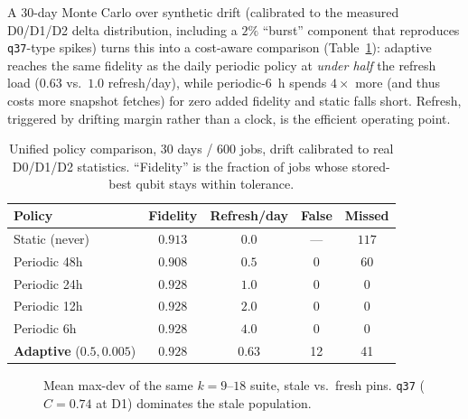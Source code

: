 \documentclass[journal,10pt,twocolumn]{IEEEtran}
\newcommand{\q}[1]{\texttt{q#1}}
\begin{document}
A 30-day Monte Carlo over synthetic drift (calibrated to the measured D0/D1/D2 delta distribution, including a
$2\%$ ``burst'' component that reproduces \q{37}-type spikes) turns this into a cost-aware comparison
(Table~\ref{tab:policy}): adaptive reaches the same fidelity as the daily periodic policy at \emph{under half} the
refresh load ($0.63$ vs.\ $1.0$ refresh/day), while periodic-$6$~h spends $4\times$ more (and thus costs more
snapshot fetches) for zero added fidelity and static falls short. Refresh, triggered by drifting margin rather than
a clock, is the efficient operating point.

\begin{table}[t]
\caption{Unified policy comparison, 30 days / 600 jobs, drift calibrated to real D0/D1/D2 statistics. ``Fidelity'' is
the fraction of jobs whose stored-best qubit stays within tolerance.}
\label{tab:policy}
\centering
\footnotesize
\setlength{\tabcolsep}{3pt}
\begin{tabular}{@{}lcccc@{}}
\toprule
Policy & Fidelity & Refresh/day & False & Missed\\
\midrule
Static (never) & $0.913$ & $0.0$ & --- & $117$\\
Periodic 48h & $0.908$ & $0.5$ & 0 & $60$\\
Periodic 24h & $0.928$ & $1.0$ & 0 & 0\\
Periodic 12h & $0.928$ & $2.0$ & 0 & 0\\
Periodic 6h & $0.928$ & $4.0$ & 0 & 0\\
\textbf{Adaptive} ($0.5,0.005$) & \textbf{$0.928$} & \textbf{$0.63$} & 12 & 41\\
\bottomrule
\end{tabular}
\end{table}

\begin{figure}[t]
\centering
{}
\caption{Mean max-dev of the same $k{=}9$--$18$ suite, stale vs.\ fresh pins. \q{37} ($C{=}0.74$ at D1) dominates
the stale population.}
\label{fig:freshness}
\end{figure}
\end{document}
